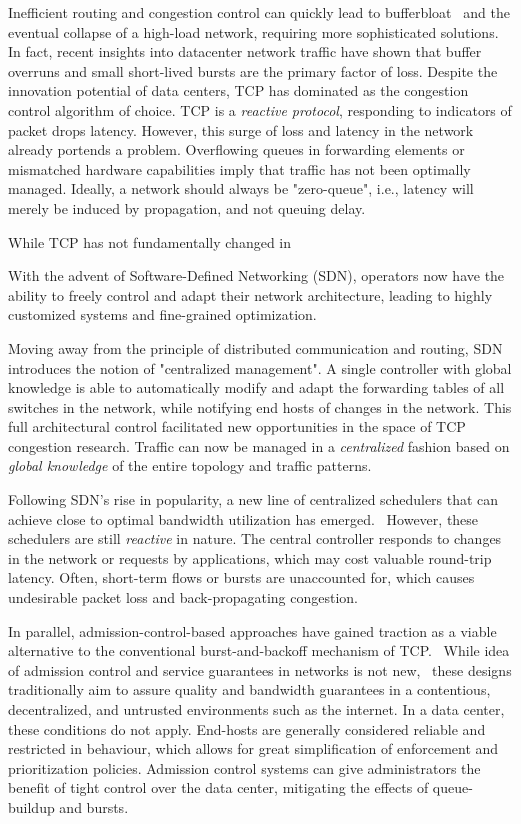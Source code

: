 Inefficient routing and congestion control can quickly lead to 
bufferbloat~\cite{bufferbloat} and the eventual collapse of a high-load 
network, requiring more sophisticated solutions. In fact, recent insights into 
datacenter network traffic have shown that buffer overruns and small 
short-lived bursts are the primary factor of loss.\cite{fb_dc,msr_dc}
Despite the innovation potential of data centers, TCP has dominated as 
the congestion control algorithm of choice.
TCP is a \textit{reactive protocol}, responding to indicators of packet drops
latency. However, this surge of loss and latency in the network already 
portends a problem. Overflowing queues in forwarding elements or mismatched 
hardware capabilities imply that traffic has not been optimally managed.
Ideally, a network should always be "zero-queue", i.e., latency 
will merely be induced by propagation, and not queuing delay.

While TCP has not fundamentally changed in 


With the advent of Software-Defined Networking (SDN), operators now have the 
ability to freely control and adapt their network architecture, leading to 
highly customized systems and fine-grained optimization.~\cite{sdn_road}

Moving away from the principle of distributed communication and routing, SDN 
introduces the notion of "centralized management". A single controller with 
global knowledge is able to automatically modify and adapt the forwarding 
tables of all switches in the network, while notifying end hosts of changes in 
the network.
This full architectural control facilitated new opportunities in the space of 
TCP congestion research. Traffic can now be managed in a  \textit{centralized} 
fashion based on \textit{global knowledge} of the entire topology and traffic 
patterns.

Following SDN's rise in popularity, a new line of centralized schedulers that 
can achieve close to optimal bandwidth utilization has emerged.~\cite{hedera, 
fastpass, microte, b4, dionysus}
However, these schedulers are still \textit{reactive} in nature. The central 
controller responds to changes in the network or requests by applications, 
which may cost valuable round-trip latency. Often, short-term flows or bursts 
are unaccounted for, which causes undesirable packet loss and back-propagating 
congestion.~\cite{perc}

In parallel, admission-control-based approaches have gained traction as a 
viable alternative to the conventional burst-and-backoff mechanism of 
TCP.~\cite{expresspass, fastpass, perc}
While idea of admission control and service guarantees in networks is not 
new,~\cite{access_limit, access_limit2} these designs traditionally 
aim to assure quality and bandwidth guarantees in a contentious, decentralized, 
and untrusted environments such as the internet. In a data center, these 
conditions do not apply. End-hosts are generally considered reliable and 
restricted in behaviour, which allows for great simplification of enforcement 
and prioritization policies. Admission control systems can give administrators 
the benefit of tight control over the data center, mitigating the effects of 
queue-buildup and bursts.

